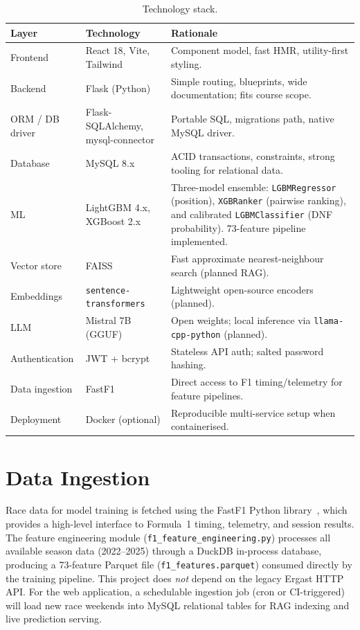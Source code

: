 \documentclass[12pt, a4paper, oneside]{report}
\begin{document}
\begin{table}[H]
\centering
\caption{Technology stack.}
\label{tab:stack}
\begin{tabularx}{\textwidth}{@{} l l X @{}}
  \toprule
  \textbf{Layer}        & \textbf{Technology}   & \textbf{Rationale} \\
  \midrule
  Frontend              & React 18, Vite, Tailwind & Component model, fast HMR, utility-first styling. \\
  Backend               & Flask (Python)        & Simple routing, blueprints, wide documentation; fits course scope. \\
  ORM / DB driver       & Flask-SQLAlchemy, mysql-connector & Portable SQL, migrations path, native MySQL driver. \\
  Database              & MySQL 8.x             & ACID transactions, constraints, strong tooling for relational data. \\
  ML                    & LightGBM 4.x, XGBoost 2.x & Three-model ensemble: \texttt{LGBMRegressor} (position), \texttt{XGBRanker} (pairwise ranking), and calibrated \texttt{LGBMClassifier} (DNF probability). 73-feature pipeline implemented. \\
  Vector store          & FAISS                 & Fast approximate nearest-neighbour search (planned RAG). \\
  Embeddings            & \texttt{sentence-transformers} & Lightweight open-source encoders (planned). \\
  LLM                   & Mistral 7B (GGUF)     & Open weights; local inference via \texttt{llama-cpp-python} (planned). \\
  Authentication        & JWT + bcrypt          & Stateless API auth; salted password hashing. \\
  Data ingestion        & FastF1                & Direct access to F1 timing/telemetry for feature pipelines. \\
  Deployment            & Docker (optional)     & Reproducible multi-service setup when containerised. \\
  \bottomrule
\end{tabularx}
\end{table}

\section{Data Ingestion}

Race data for model training is fetched using the FastF1 Python
library~\cite{fastF1}, which provides a high-level interface to Formula~1 timing,
telemetry, and session results. The feature engineering module (\texttt{f1\_feature\_engineering.py})
processes all available season data (2022--2025) through a DuckDB in-process database,
producing a 73-feature Parquet file (\texttt{f1\_features.parquet}) consumed directly by
the training pipeline. This project does \emph{not} depend on the legacy Ergast HTTP API.
For the web application, a schedulable ingestion job (cron or CI-triggered) will load
new race weekends into MySQL relational tables for RAG indexing and live prediction serving.
\end{document}
